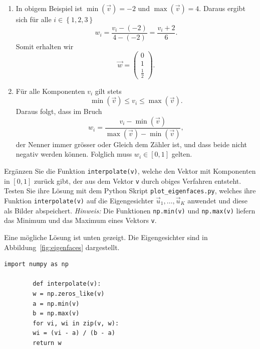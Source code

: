 \begin{losung}
	\phantom{text}
	\begin{enumerate}[label=(\alph*)]
		\item In obigem Beispiel ist $\min\left(\vec v\right)=-2$ und $\max\left(\vec v\right)=4$.
		Daraus ergibt sich für alle $i\in\left\{1,2,3\right\}$
		\begin{equation*}
			w_i=\frac{v_i-\left(-2\right)}{4-\left(-2\right)}=\frac{v_i+2}{6}.
		\end{equation*}
		Somit erhalten wir
		\begin{equation*}
			\vec w=
			\begin{pmatrix}
				0 \\
				1 \\
				\tfrac{1}{2}
			\end{pmatrix}.
		\end{equation*}
		\item Für alle Komponenten $v_i$ gilt stets
		\begin{equation*}
			\min\left(\vec v\right)\leq v_i\leq\max\left(\vec v\right).
		\end{equation*}
		Daraus folgt, dass im Bruch
		\begin{equation*}
			w_i=\frac{v_i-\min\left(\vec v\right)}{\max\left(\vec v\right)-\min\left(\vec v\right)},
		\end{equation*}
		der Nenner immer grösser oder Gleich dem Zähler ist, und dass beide nicht negativ werden können.
		Folglich muss $w_i\in\left[0,1\right]$ gelten.
	\end{enumerate}
\end{losung}
\begin{aufgabe} \label{aufg:scaling_code}
	Ergänzen Sie die Funktion \texttt{interpolate(v)}, welche den Vektor mit Komponenten in $\left[0,1\right]$ zurück gibt, der aus dem Vektor \texttt{v} durch obiges Verfahren entsteht.
	Testen Sie ihre Lösung mit dem Python Skript \texttt{plot\_eigenfaces.py}, welches ihre Funktion \texttt{interpolate(v)} auf die Eigengesichter $\vec u_1,\ldots,\vec u_K$ anwendet und diese als Bilder abspeichert.
	\textit{Hinweis:} Die Funktionen \texttt{np.min(v)} und \texttt{np.max(v)} liefern das Minimum und das Maximum eines Vektors \texttt{v}.
\end{aufgabe}
\begin{losung}
	Eine mögliche Lösung ist unten gezeigt.
	Die Eigengesichter sind in Abbildung~\ref{fig:eigenfaces} dargestellt.
	\begin{lstlisting}[style=python]
		import numpy as np
		
		def interpolate(v):
		w = np.zeros_like(v)
		a = np.min(v)
		b = np.max(v)
		for vi, wi in zip(v, w):
		wi = (vi - a) / (b - a)
		return w
	\end{lstlisting}
\end{losung}

